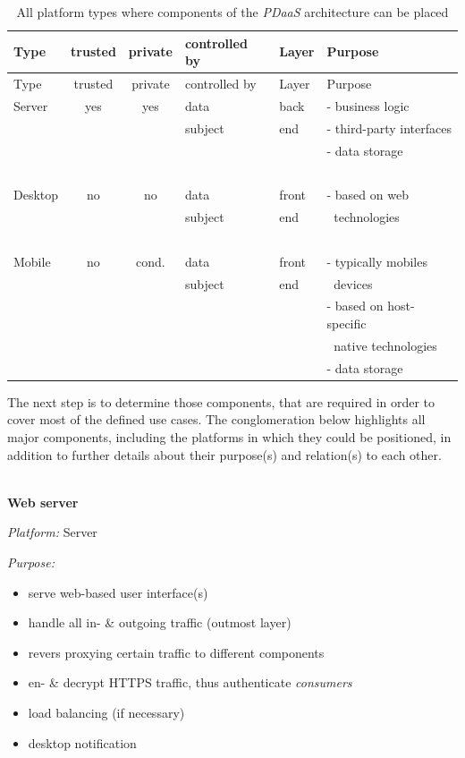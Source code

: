 \documentclass[12pt,english,a4paper,titlepage,cleardoublepage=empty,dottedtoc]{report}
\providecommand{\tightlist}{%
  \setlength{\itemsep}{0pt}\setlength{\parskip}{0pt}}
\begin{document}
\begin{longtable}[]{@{}lcclll@{}}
\caption{All platform types where components of the \emph{PDaaS}
architecture can be placed
\label{tbl:platforms-characteristics}}\tabularnewline
\toprule
Type & trusted & private & controlled by & Layer &
Purpose\tabularnewline
\midrule
\endfirsthead
\toprule
Type & trusted & private & controlled by & Layer &
Purpose\tabularnewline
\midrule
\endhead
Server & yes & yes & data & back & - business logic\tabularnewline
\(\ \) & \(\ \) & \(\ \) & subject & end & - third-party
interfaces\tabularnewline
\(\ \) & \(\ \) & \(\ \) & \(\ \) & \(\ \) & - data
storage\tabularnewline
\(\ \) & \(\ \) & \(\ \) & \(\ \) & \(\ \) & \(\ \)\tabularnewline
Desktop & no & no & data & front & - based on web\tabularnewline
\(\ \) & \(\ \) & \(\ \) & subject & end & \(\ \)
technologies\tabularnewline
\(\ \) & \(\ \) & \(\ \) & \(\ \) & \(\ \) & \(\ \)\tabularnewline
Mobile & no & cond. & data & front & - typically mobiles\tabularnewline
\(\ \) & \(\ \) & \(\ \) & subject & end & \(\ \) devices\tabularnewline
\(\ \) & \(\ \) & \(\ \) & \(\ \) & \(\ \) & - based on
host-specific\tabularnewline
\(\ \) & \(\ \) & \(\ \) & \(\ \) & \(\ \) & \(\ \) native
technologies\tabularnewline
\(\ \) & \(\ \) & \(\ \) & \(\ \) & \(\ \) & - data
storage\tabularnewline
\bottomrule
\end{longtable}

The next step is to determine those components, that are required in
order to cover most of the defined use cases. The conglomeration below
highlights all major components, including the platforms in which they
could be positioned, in addition to further details about their
purpose(s) and relation(s) to each other.

~\\
\textbf{Web server}

\emph{Platform:} Server

\emph{Purpose:}

\begin{itemize}
\tightlist
\item
  serve web-based user interface(s)
\item
  handle all in- \& outgoing traffic (outmost layer)
\item
  revers proxying certain traffic to different components
\item
  en- \& decrypt HTTPS traffic, thus authenticate \emph{consumers}
\item
  load balancing (if necessary)
\item
  desktop notification
\end{itemize}
\end{document}
